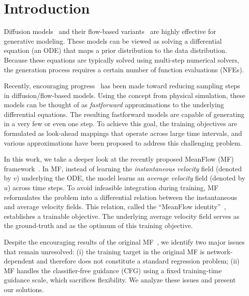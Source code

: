 \vspace{-1.em}
\section{Introduction}

Diffusion models~\cite{diffusion,ddpm,scoresde} and their flow-based variants~\cite{fm,rectified,stochasticflow} are highly effective for generative modeling.
These models can be viewed as solving a differential equation (\eg an ODE) that maps a prior distribution to the data distribution.
Because these equations are typically solved using multi-step numerical solvers, the generation process requires a certain number of function evaluations (NFEs).

Recently, encouraging progress~\cite{cm,ict,ect,scm,shortcut,imm,mf} has been made toward reducing sampling steps in diffusion/flow-based models.
Using the concept from physical simulation, these models can be thought of as \emph{fastforward} approximations to the underlying differential equations.
The resulting fastforward models are capable of generating in a very few or even one step.
To achieve this goal, the training objectives are formulated as look-ahead mappings that operate across large time intervals, and various approximations have been proposed to address this challenging problem.



In this work, we take a deeper look at the recently proposed MeanFlow (MF) framework~\cite{mf}.
In MF, instead of learning the \emph{instantaneous velocity} field (denoted by $v$) underlying the ODE, the model learns an \emph{average velocity} field (denoted by $u$) across time steps. 
To avoid infeasible integration during training, MF reformulates the problem into a differential relation between the instantaneous and average velocity fields.
This relation, called the ``MeanFlow identity''~\cite{mf}, establishes a trainable objective.  
The underlying average velocity field serves as the ground-truth and as the optimum of this training objective.

Despite the encouraging results of the original MF~\cite{mf}, we identify two major issues that remain unresolved: (i) the training target in the original MF is network-dependent and therefore does not constitute a standard regression problem; (ii) MF handles the classifier-free guidance (CFG) \cite{cfg} using a fixed training-time guidance scale, which sacrifices flexibility. 
We analyze these issues and present our solutions.

